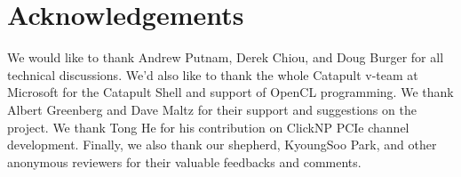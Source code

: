 \vspace{-6pt}
\section*{Acknowledgements}

We would like to thank Andrew Putnam, Derek Chiou, and Doug Burger for all technical discussions.
We'd also like to thank the whole Catapult v-team at Microsoft for the Catapult Shell and support of OpenCL programming.
We thank Albert Greenberg and Dave Maltz for their support and suggestions on the project.
We thank Tong He for his contribution on ClickNP PCIe channel development.
Finally, we also thank our shepherd, KyoungSoo Park, and other anonymous reviewers for their valuable feedbacks and comments.
